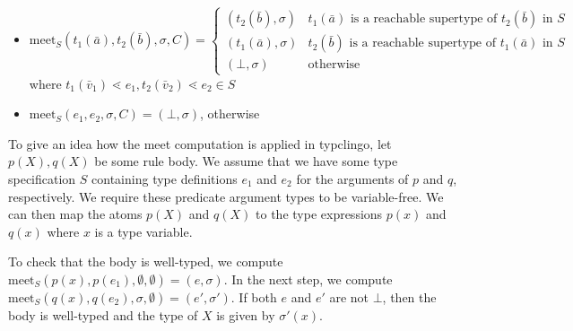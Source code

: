 \documentclass[a4paper]{amsart}
\newcommand\meet{\mathrm{meet}}
\begin{document}
\begin{itemize}
	\item $\meet_S(t_1(\bar a),t_2(\bar b),\sigma,C) = \begin{cases} (t_2(\bar b), \sigma) & t_1(\bar a) \text{ is a reachable supertype of } t_2(\bar b) \text{ in } S \\ (t_1(\bar a), \sigma) & t_2(\bar b) \text{ is a reachable supertype of } t_1(\bar a) \text{ in } S \\ (\bot,\sigma) & \text{otherwise} \end{cases}$\\
	      where $t_1(\bar v_1) \lessdot e_1, t_2(\bar v_2) \lessdot e_2 \in S$
	\item $\meet_S(e_1,e_2,\sigma,C) = (\bot,\sigma)$, otherwise
\end{itemize}



To give an idea how the meet computation is applied in typclingo,
let $p(X), q(X)$ be some rule body.
We assume that we have some type specification $S$ containing type definitions $e_1$ and $e_2$
for the arguments of $p$ and $q$, respectively.
We require these predicate argument types to be variable-free.
We can then map the atoms $p(X)$ and $q(X)$ to the type expressions $p(x)$ and $q(x)$ where $x$ is a type variable.

To check that the body is well-typed,
we compute $\mathrm{meet}_{S}(p(x), p(e_1),\emptyset,\emptyset) = (e,\sigma)$.
In the next step, we compute $\mathrm{meet}_{S}(q(x), q(e_2),\sigma,\emptyset) = (e',\sigma')$.
If both $e$ and $e'$ are not $\bot$,
then the body is well-typed and the type of $X$ is given by $\sigma'(x)$.

\newpage

\end{document}
